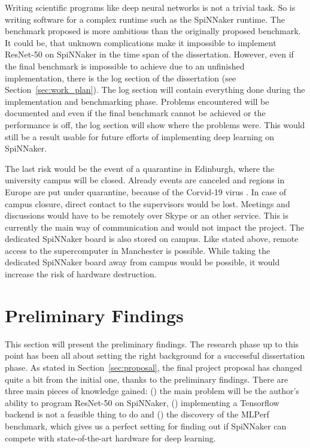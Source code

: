 \documentclass{article}
\begin{document}
Writing scientific programs like deep neural networks is
not a trivial task.
So is writing software for a complex runtime such as the
SpiNNaker runtime.
The benchmark proposed is more ambitious than the originally proposed
benchmark.
It could be, that unknown complications make it impossible to
implement ResNet-50 on SpiNNaker in the time span of the dissertation.
However, even if the final benchmark is impossible to achieve
due to an unfinished implementation, there is the log
section of the dissertation (see Section~\ref{sec:work_plan}).
The log section will contain everything done during the
implementation and benchmarking phase.
Problems encountered will be documented and even if the
final benchmark cannot be achieved or the performance is
off, the log section will show where the problems were.
This would still be a result usable for future efforts of implementing
deep learning on SpiNNaker.

The last risk would be the event of a quarantine in Edinburgh,
where the university campus will be closed.
Already events are canceled and regions in Europe are put under
quarantine, because of the Corvid-19 virus
\citep{borghese_et_al_2020}.
In case of campus closure, direct contact to the supervisors would be
lost.
Meetings and discussions would have to be remotely over Skype or an
other service.
This is currently the main way of communication and would not impact
the project.
The dedicated SpiNNaker board is also stored on campus.
Like stated above, remote access to the supercomputer in Manchester
is possible.
While taking the dedicated SpiNNaker board away from campus would be
possible, it would increase the risk of hardware destruction.


\section{Preliminary Findings} %
\label{sec:prelim}

This section will present the preliminary findings.
The research phase up to this point has been all about setting the
right background for a successful dissertation phase.
As stated in Section~\ref{sec:proposal}, the final
project proposal has changed quite a bit from the initial
one, thanks to the preliminary findings.
There are three main pieces of knowledge gained:
() the main problem will be the author's ability to
program ResNet-50 on SpiNNaker,
() implementing a Tensorflow backend is not a feasible
thing to do and () the discovery of the MLPerf
benchmark, which gives us a perfect setting for finding out if
SpiNNaker can compete with state-of-the-art hardware for
deep learning.
\end{document}
